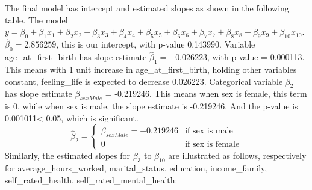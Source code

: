 \documentclass[
]{article}
\begin{document}
The final model has intercept and estimated slopes as shown in the
following table. The model
\(y = \beta_{0} + \beta_{1}x_1 +\beta_{2}x_2 + \beta_{3}x_3 +\beta_{4}x_4 + \beta_{5}x_5 +\beta_{6}x_6 + \beta_{7}x_7 +\beta_{8}x_8 + \beta_{9}x_9 + \beta_{10}x_{10}\).
\(\hat\beta_{0} = 2.856259\), this is our intercept, with p-value
0.143990. Variable age\_at\_first\_birth has slope estimate
\(\hat\beta_{1} =-0.026223\), with p-value = 0.000113. This means with 1
unit increase in age\_at\_first\_birth, holding other variables
constant, feeling\_life is expected to decrease 0.026223. Categorical
variable \(\beta_2\) has slope estimate \(\beta_{sexMale}\) = -0.219246.
This means when sex is female, this term is 0, while when sex is male,
the slope estimate is -0.219246. And the p-value is 0.001011\textless{}
0.05, which is significant. \begin{equation}
  \hat\beta_{2} =
    \begin{cases}
      \beta_{sexMale} = -0.219246 & \text{if sex is male}\\
      0 & \text{if sex is female}
    \end{cases}       
\end{equation} Similarly, the estimated slopes for \(\beta_{3}\) to
\(\beta_{10}\) are illustrated as follows, respectively for
average\_hours\_worked, marital\_status, education, income\_family,
self\_rated\_health, self\_rated\_mental\_health:\\
\end{document}
